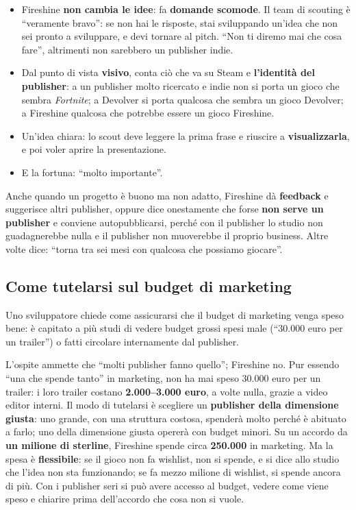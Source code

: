 \begin{itemize}
  \item Fireshine \textbf{non cambia le idee}: fa \textbf{domande scomode}. Il team
        di scouting è ``veramente bravo'': se non hai le risposte, stai sviluppando
        un'idea che non sei pronto a sviluppare, e devi tornare al pitch. ``Non ti
        diremo mai che cosa fare'', altrimenti non sarebbero un publisher indie.
  \item Dal punto di vista \textbf{visivo}, conta ciò che va su Steam e
        \textbf{l'identità del publisher}: a un publisher molto ricercato e indie
        non si porta un gioco che sembra \emph{Fortnite}; a Devolver si porta
        qualcosa che sembra un gioco Devolver; a Fireshine qualcosa che potrebbe
        essere un gioco Fireshine.
  \item Un'idea chiara: lo scout deve leggere la prima frase e riuscire a
        \textbf{visualizzarla}, e poi voler aprire la presentazione.
  \item E la fortuna: ``molto importante''.
\end{itemize}
Anche quando un progetto è buono ma non adatto, Fireshine dà \textbf{feedback} e
suggerisce altri publisher, oppure dice onestamente che forse \textbf{non serve un
publisher} e conviene autopubblicarsi, perché con il publisher lo studio non
guadagnerebbe nulla e il publisher non muoverebbe il proprio business. Altre volte
dice: ``torna tra sei mesi con qualcosa che possiamo giocare''.

\subsection{Come tutelarsi sul budget di marketing}

Uno sviluppatore chiede come assicurarsi che il budget di marketing venga speso
bene: è capitato a più studi di vedere budget grossi spesi male (``30.000 euro per
un trailer'') o fatti circolare internamente dal publisher.

L'ospite ammette che ``molti publisher fanno quello''; Fireshine no. Pur essendo
``una che spende tanto'' in marketing, non ha mai speso 30.000 euro per un trailer:
i loro trailer costano \textbf{2.000--3.000 euro}, a volte nulla, grazie a video
editor interni. Il modo di tutelarsi è scegliere un \textbf{publisher della
dimensione giusta}: uno grande, con una struttura costosa, spenderà molto perché è
abituato a farlo; uno della dimensione giusta opererà con budget minori. Su un
accordo da \textbf{un milione di sterline}, Fireshine spende circa
\textbf{250.000} in marketing. Ma la spesa è \textbf{flessibile}: se il gioco non
fa wishlist, non si spende, e si dice allo studio che l'idea non sta funzionando;
se fa mezzo milione di wishlist, si spende ancora di più. Con i publisher seri si
può avere accesso al budget, vedere come viene speso e chiarire prima dell'accordo
che cosa non si vuole.

